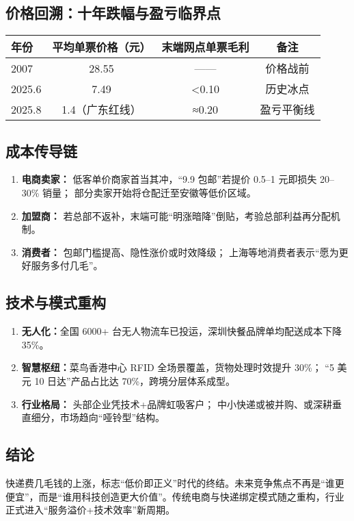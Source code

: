 \subsection{价格回溯：十年跌幅与盈亏临界点}
\begin{table}[h]
\centering
\begin{tabular}{lccc}
\toprule
年份 & 平均单票价格（元） & 末端网点单票毛利 & 备注 \\
\midrule
2007 & 28.55 & —— & 价格战前 \\
2025.6 & 7.49 & <0.10 & 历史冰点 \\
2025.8 & 1.4（广东红线） & ≈0.20 & 盈亏平衡线 \\
\bottomrule
\end{tabular}
\end{table}

\subsection{成本传导链}
\begin{enumerate}[leftmargin=*, nosep]
  \item \textbf{电商卖家：}  
        低客单价商家首当其冲，“9.9 包邮”若提价 0.5–1 元即损失 20–30\% 销量；  
        部分卖家开始将仓配迁至安徽等低价区域。
  \item \textbf{加盟商：}  
        若总部不返补，末端可能“明涨暗降”倒贴，考验总部利益再分配机制。
  \item \textbf{消费者：}  
        包邮门槛提高、隐性涨价或时效降级；  
        上海等地消费者表示“愿为更好服务多付几毛”。
\end{enumerate}

\subsection{技术与模式重构}
\begin{enumerate}[leftmargin=*, nosep]
  \item \textbf{无人化：}全国 6000+ 台无人物流车已投运，深圳快餐品牌单均配送成本下降 35\%。
  \item \textbf{智慧枢纽：}菜鸟香港中心 RFID 全场景覆盖，货物处理时效提升 30\%；  
        “5 美元 10 日达”产品占比达 70\%，跨境分层体系成型。
  \item \textbf{行业格局：}  
        头部企业凭技术+品牌虹吸客户；  
        中小快递或被并购、或深耕垂直细分，市场趋向“哑铃型”结构。
\end{enumerate}

\subsection{结论}
快递费几毛钱的上涨，标志“低价即正义”时代的终结。未来竞争焦点不再是“谁更便宜”，而是“谁用科技创造更大价值”。传统电商与快递绑定模式随之重构，行业正式进入“服务溢价+技术效率”新周期。




